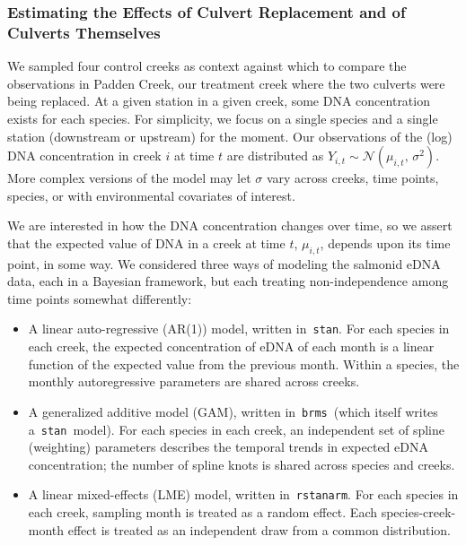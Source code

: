 \documentclass[
]{article}
\begin{document}
\hypertarget{estimating-the-effects-of-culvert-replacement-and-of-culverts-themselves}{%
\subsubsection{Estimating the Effects of Culvert Replacement and of
Culverts
Themselves}\label{estimating-the-effects-of-culvert-replacement-and-of-culverts-themselves}}

We sampled four control creeks as context against which to compare the
observations in Padden Creek, our treatment creek where the two culverts
were being replaced. At a given station in a given creek, some DNA
concentration exists for each species. For simplicity, we focus on a
single species and a single station (downstream or upstream) for the
moment. Our observations of the (log) DNA concentration in creek \(i\)
at time \(t\) are distributed as
\(Y_{i,t} \sim \mathcal{N}(\mu_{i,t},\,\sigma^{2})\). More complex
versions of the model may let \(\sigma\) vary across creeks, time
points, species, or with environmental covariates of interest.

We are interested in how the DNA concentration changes over time, so we
assert that the expected value of DNA in a creek at time \(t\),
\(\mu_{i,t}\), depends upon its time point, in some way. We considered
three ways of modeling the salmonid eDNA data, each in a Bayesian
framework, but each treating non-independence among time points somewhat
differently:

\begin{itemize}
\item
  A linear auto-regressive (AR(1)) model, written in~\texttt{stan}. For
  each species in each creek, the expected concentration of eDNA of each
  month is a linear function of the expected value from the previous
  month. Within a species, the monthly autoregressive parameters are
  shared across creeks.
\item
  A generalized additive model (GAM), written in~\texttt{brms}~(which
  itself writes a~\texttt{stan}~model). For each species in each creek,
  an independent set of spline (weighting) parameters describes the
  temporal trends in expected eDNA concentration; the number of spline
  knots is shared across species and creeks.
\item
  A linear mixed-effects (LME) model, written in~\texttt{rstanarm}. For
  each species in each creek, sampling month is treated as a random
  effect. Each species-creek-month effect is treated as an independent
  draw from a common distribution.~
\end{itemize}
\end{document}
